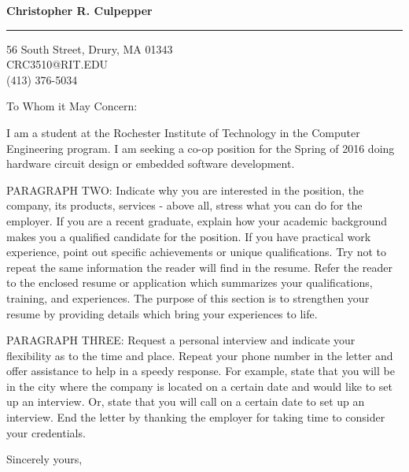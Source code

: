 \documentclass{letter} %
\date{}
\begin{document}
\signature{Christopher R. Culpepper}           %
\longindentation=0pt                       %
 
 
\begin{letter}{}%


\begin{flushleft}
{\large\bf Christopher R. Culpepper}
\end{flushleft}
\medskip\hrule height 1pt
\begin{flushright}
\hfill 56 South Street, Drury, MA 01343\\
\hfill CRC3510@RIT.EDU \\
\hfill (413) 376-5034 
\end{flushright} 
\vfill %

 
\opening{To Whom it May Concern:} 
 
\noindent I am a student at the Rochester Institute of Technology in the 
Computer Engineering program. I am seeking a co-op position for the Spring 
of 2016 doing hardware circuit design or embedded software development. 
 
\noindent 
PARAGRAPH  TWO:  Indicate why you are interested in the position, 
the company, its products, services - above all, stress what  you 
can  do  for  the employer. If you are a recent graduate, explain 
how your academic background makes you a qualified candidate  for 
the  position.  If  you have practical work experience, point out 
specific achievements or unique qualifications. Try not to repeat 
the  same  information  the reader will find in the resume. Refer 
the reader to the enclosed resume or application which summarizes 
your  qualifications,  training,  and experiences. The purpose of 
this section is to strengthen your resume  by  providing  details 
which bring your experiences to life. 
 
\noindent PARAGRAPH THREE: Request a personal interview and  indicate  your 
flexibility as to the time and place. Repeat your phone number in 
the letter and offer assistance to help in a speedy response. For 
example,  state that you will be in the city where the company is 
located on a certain date and would like to set up an  interview. 
Or,  state  that  you  will  call  on a certain date to set up an 
interview. End the letter by thanking  the  employer  for  taking 
time to consider your credentials. 
 
\closing{Sincerely yours,} 
 

 

\end{letter}
 
\end{document}
